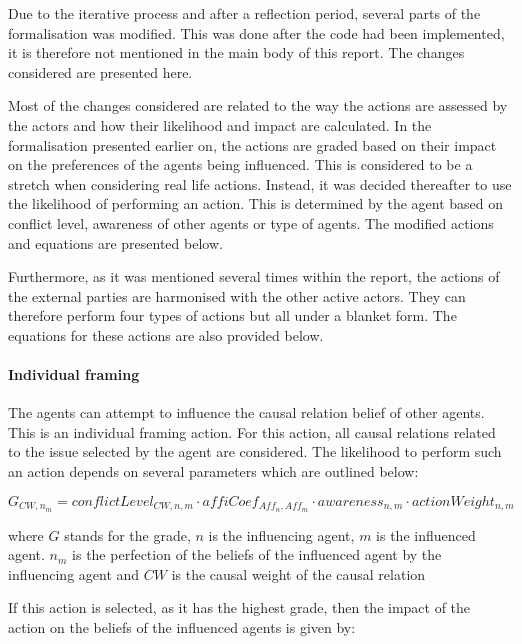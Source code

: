Due to the iterative process and after a reflection period, several parts of the formalisation was modified. This was done after the code had been implemented, it is therefore not mentioned in the main body of this report. The changes considered are presented here.

Most of the changes considered are related to the way the actions are assessed by the actors and how their likelihood and impact are calculated. In the formalisation presented earlier on, the actions are graded based on their impact on the preferences of the agents being influenced. This is considered to be a stretch when considering real life actions. Instead, it was decided thereafter to use the likelihood of performing an action. This is determined by the agent based on conflict level, awareness of other agents or type of agents. The modified actions and equations are presented below.

Furthermore, as it was mentioned several times within the report, the actions of the external parties are harmonised with the other active actors. They can therefore perform four types of actions but all under a blanket form. The equations for these actions are also provided below.

\paragraph{Individual framing}

The agents can attempt to influence the causal relation belief of other agents. This is an individual framing action. For this action, all causal relations related to the issue selected by the agent are considered. The likelihood to perform such an action depends on several parameters which are outlined below:

\begin{equation}\label{eq:likelihoodFraming2}
G_{CW, n_m} = conflictLevel_{CW, n, m} \cdot affiCoef_{Aff_n,Aff_m} \cdot awareness_{n,m} \cdot actionWeight_{n,m}
\end{equation}

where $G$ stands for the grade, $n$ is the influencing agent, $m$ is the influenced agent. $n_m$ is the perfection of the beliefs of the influenced agent by the influencing agent and $CW$ is the causal weight of the causal relation

If this action is selected, as it has the highest grade, then the impact of the action on the beliefs of the influenced agents is given by:


